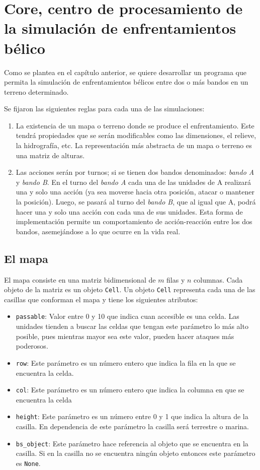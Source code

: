 \section{Core, centro de procesamiento de la simulación de enfrentamientos bélico}

Como se plantea en el capítulo anterior, se quiere desarrollar un programa que permita la simulación de enfrentamientos bélicos entre dos o más bandos en un terreno determinado.

Se fijaron las siguientes reglas para cada una de las simulaciones:

\begin{enumerate}
	\item La existencia de un mapa o terreno donde se produce el enfrentamiento. Este tendrá propiedades que se serán modificables como las dimensiones, el relieve, la hidrografía, etc. La representación más abstracta de un mapa o terreno es una matriz de alturas.
	
	\item Las acciones serán por turnos; si se tienen dos bandos denominados: \textit{bando A} y \textit{bando B}. En el turno del \textit{bando A} cada una de las unidades de A realizará una y solo una acción (ya sea moverse hacia otra posición, atacar o mantener la posición). Luego, se pasará al turno del \textit{bando B}, que al igual que A, podrá hacer una y solo una acción con cada una de sus unidades. Esta forma de implementación permite un comportamiento de acción-reacción entre los dos bandos, asemejándose a lo que ocurre en la vida real.
\end{enumerate}

\subsection{El mapa}

El mapa consiste en una matriz bidimensional de $m$ filas y $n$ columnas. Cada objeto de la matriz es un objeto \verb|Cell|. Un objeto \verb|Cell| representa cada una de las casillas que conforman el mapa y tiene los siguientes atributos:

\begin{itemize}
	\item \verb|passable|: Valor entre 0 y 10 que indica cuan accesible es una celda. Las unidades tienden a buscar las celdas que tengan este parámetro lo más alto posible, pues mientras mayor sea este valor, pueden hacer ataques más poderosos.
	\item \verb|row|: Este parámetro es un número entero que indica la fila en la que se encuentra la celda.
	\item \verb|col|: Este parámetro es un número entero que indica la columna en que se encuentra la celda
	\item \verb|height|: Este parámetro es un número entre 0 y 1 que indica la altura de la casilla. En dependencia de este parámetro la casilla será terrestre o marina.
	\item \verb|bs_object|: Este parámetro hace referencia al objeto que se encuentra en la casilla. Si en la casilla no se encuentra ningún objeto entonces este parámetro es \verb|None|.
\end{itemize}


